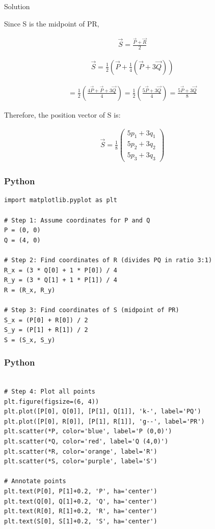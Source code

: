 \documentclass{beamer}
\begin{document}
\begin{frame}{Solution}
    


Since S is the midpoint of PR,

\begin{align}
\vec{S} = \frac{\vec{P} + \vec{R}}{2}
\end{align}

\begin{align}
\vec{S} = \frac{1}{2} \left( \vec{P} + \frac{1}{4}(\vec{P} + 3\vec{Q}) \right )
\end{align}

\begin{align}
= \frac{1}{2} \left( \frac{4\vec{P} + \vec{P} + 3\vec{Q}}{4} \right )
= \frac{1}{2} \left( \frac{5\vec{P} + 3\vec{Q}}{4} \right )
= \frac{5\vec{P} + 3\vec{Q}}{8}
\end{align}


Therefore, the position vector of S is:

\begin{align}
\boxed{
\vec{S} =
\frac{1}{8}
\begin{pmatrix}
5p_1 + 3q_1 \\
5p_2 + 3q_2 \\
5p_3 + 3q_3
\end{pmatrix}
}
\end{align}


\end{frame}


\begin{frame}[fragile]
    \frametitle{Python}
    \begin{lstlisting}
import matplotlib.pyplot as plt

# Step 1: Assume coordinates for P and Q
P = (0, 0)
Q = (4, 0)

# Step 2: Find coordinates of R (divides PQ in ratio 3:1)
R_x = (3 * Q[0] + 1 * P[0]) / 4
R_y = (3 * Q[1] + 1 * P[1]) / 4
R = (R_x, R_y)

# Step 3: Find coordinates of S (midpoint of PR)
S_x = (P[0] + R[0]) / 2
S_y = (P[1] + R[1]) / 2
S = (S_x, S_y)

\end{lstlisting}
\end{frame}


\begin{frame}[fragile]
    \frametitle{Python}
    \begin{lstlisting}

# Step 4: Plot all points
plt.figure(figsize=(6, 4))
plt.plot([P[0], Q[0]], [P[1], Q[1]], 'k-', label='PQ')
plt.plot([P[0], R[0]], [P[1], R[1]], 'g--', label='PR')
plt.scatter(*P, color='blue', label='P (0,0)')
plt.scatter(*Q, color='red', label='Q (4,0)')
plt.scatter(*R, color='orange', label='R')
plt.scatter(*S, color='purple', label='S')

# Annotate points
plt.text(P[0], P[1]+0.2, 'P', ha='center')
plt.text(Q[0], Q[1]+0.2, 'Q', ha='center')
plt.text(R[0], R[1]+0.2, 'R', ha='center')
plt.text(S[0], S[1]+0.2, 'S', ha='center')


\end{lstlisting}
\end{frame}
\end{document}

